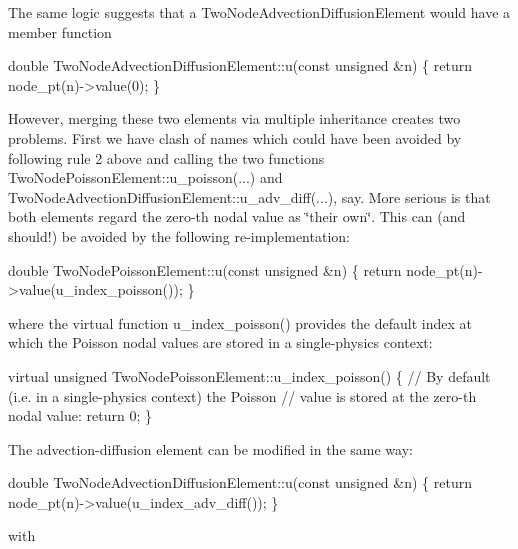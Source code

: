 The same logic suggests that a {\ttfamily Two\+Node\+Advection\+Diffusion\+Element} would have a member function 
\begin{DoxyCode}
\textcolor{keywordtype}{double} TwoNodeAdvectionDiffusionElement::u(\textcolor{keyword}{const} \textcolor{keywordtype}{unsigned} &n) 
 \{
  \textcolor{keywordflow}{return} node\_pt(n)->value(0);
 \}
\end{DoxyCode}


However, merging these two elements via multiple inheritance creates two problems. First we have clash of names which could have been avoided by following rule 2 above and calling the two functions {\ttfamily Two\+Node\+Poisson\+Element\+::u\+\_\+poisson}(...) and {\ttfamily Two\+Node\+Advection\+Diffusion\+Element\+::u\+\_\+adv\+\_\+diff}(...), say. More serious is that both elements regard the zero-\/th nodal value as \char`\"{}their own\char`\"{}. This can (and should!) be avoided by the following re-\/implementation\+:


\begin{DoxyCode}
\textcolor{keywordtype}{double} TwoNodePoissonElement::u(\textcolor{keyword}{const} \textcolor{keywordtype}{unsigned} &n) 
 \{
  \textcolor{keywordflow}{return} node\_pt(n)->value(u\_index\_poisson());
 \}
\end{DoxyCode}


where the virtual function {\ttfamily u\+\_\+index\+\_\+poisson()} provides the default index at which the Poisson nodal values are stored in a single-\/physics context\+:


\begin{DoxyCode}
\textcolor{keyword}{virtual} \textcolor{keywordtype}{unsigned} TwoNodePoissonElement::u\_index\_poisson()
 \{
  \textcolor{comment}{// By default (i.e. in a single-physics context) the Poisson }
  \textcolor{comment}{// value is stored at the zero-th nodal value:}
  \textcolor{keywordflow}{return} 0;
 \}
\end{DoxyCode}


The advection-\/diffusion element can be modified in the same way\+:


\begin{DoxyCode}
\textcolor{keywordtype}{double} TwoNodeAdvectionDiffusionElement::u(\textcolor{keyword}{const} \textcolor{keywordtype}{unsigned} &n) 
 \{
  \textcolor{keywordflow}{return} node\_pt(n)->value(u\_index\_adv\_diff());
 \}
\end{DoxyCode}


with



